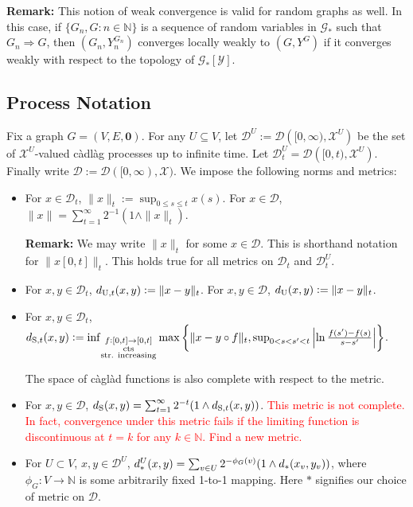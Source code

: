 \documentclass[12pt]{article}
\newcommand{\skipLine}{\vspace{12pt}}
\newcommand{\mb}{\mathbb}
\newcommand{\mc}{\mathcal}
\newcommand{\ra}{\rightarrow}
\newcommand{\te}{\text}
\newcommand{\tr}{\textcolor{red}}
\newcommand{\remark}{\textbf{Remark: }}
\newcommand{\defeq}{:=}								%
\newcommand{\cad}{\mc{D}}							%
\newcommand{\sta}{\mc{X}}							%
\renewcommand{\root}{\mathbf{0}}					%
\newcommand{\utmet}[1]{
\ifstrempty{#1}{
	d_{\te{U}}}{
	d_{\te{U},#1}}}									%
\newcommand{\stmet}[1]{
\ifstrempty{#1}{
	d_{\te{S}}}{
	d_{\te{S},#1}}}									%
\newcommand{\xf}{x}									%
\newcommand{\xg}{y}									%
\newcommand{\met}[2]{
\ifstrempty{#2}{
	d_{#1}}{
	d_{#1,#2}}}										%
\newcommand{\vind}[1]{_{#1}}						%
\newcommand{\tme}[1]{(#1)}							%
\newcommand{\tmi}[1]{#1}							%
\newcommand{\gind}[1]{^{#1}}						%
\newcommand{\vpara}[1]{^{#1}}						%
\newcommand{\tpara}[1]{_{#1}}						%
\newcommand{\Gs}{\mc{G}_\ast}						%
\newcommand{\spce}{\mc{Y}}							%
\renewcommand{\sp}[1]{[#1]}							%
\newcommand{\Xg}{Y}									%
\renewcommand{\it}[1]{_{#1}}						%
\begin{document}
\skipLine

\remark This notion of weak convergence is valid for random graphs as well. In this case, if \(\{G\it{n},G:n\in\mb{N}\}\) is a sequence of random variables in \(\Gs\) such that \(G\it{n}\Rightarrow G\), then \((G\it{n},\Xg\gind{G\it{n}}\it{n})\) converges locally weakly to \((G,\Xg\gind{G})\) if it converges weakly with respect to the topology of \(\Gs\sp{\spce}\).

\subsection{Process Notation}
\label{not::p}

Fix a graph \(G = (V,E,\root)\). For any \(U \subseteq V\), let \(\cad\vpara{U} := \cad\left([0,\infty),\sta^U\right)\) be the set of \(\sta^U\)-valued c\`adl\`ag processes up to infinite time. Let \(\cad\vpara{U}\tpara{t} = \cad\left([0,t),\sta^U\right)\). Finally write \(\cad \defeq \cad([0,\infty),\sta)\). We impose the following norms and metrics:

\begin{itemize}
\item For \(\xf \in \cad\tpara{t}\), \(\|\xf\|\tpara{t} \defeq \sup_{0\leq s \leq t} \xf\tme{s}\). For \(\xf \in \cad\), \(\|\xf\| = \sum_{t=1}^\infty 2^{-1}(1\wedge \|\xf\|\tpara{t})\).

\skipLine

\remark We may write \(\|\xf\|_t\) for some \(\xf \in \cad\). This is shorthand notation for \(\|\xf\tmi{[0,t]}\|_t\). This holds true for all metrics on \(\cad\tpara{t}\) and \(\cad\vpara{U}\tpara{t}\).

\skipLine 

\item For \(\xf,\xg \in \cad\tpara{t}\), \(\utmet{t}(\xf,\xg) \defeq \|\xf-\xg\|\tpara{t}\). For \(\xf,\xg \in \cad\), \(\utmet{}(\xf,\xg) \defeq \|\xf - \xg\|\tpara{t}\).

\item For \(\xf,\xg \in \cad\tpara{t}\), \(\stmet{t}(\xf,\xg)  \defeq \inf_{\substack{f:[0,t]\ra[0,t]\\\te{cts}\\\te{str. increasing}}}\max\left\{\|\xf-\xg\circ f\|\tpara{t},\sup_{0<s<s'<t}\left|\ln \frac{f(s') -f(s)}{s-s'}\right|\right\}\).

The space of c\`agl\`ad functions is also complete with respect to the metric.

\item For \(\xf,\xg \in \cad\), \(\stmet{}(\xf,\xg) = \sum_{t=1}^\infty 2^{-t}(1\wedge \stmet{t}(\xf,\xg))\). \tr{This metric is not complete. In fact, convergence under this metric fails if the limiting function is discontinuous at \(t = k\) for any \(k \in \mb{N}\). Find a new metric.}

\item For \(U \subset V\), \(\xf,\xg\in \cad\vpara{U}\), \(\met{\ast}{}\vpara{U}(\xf,\xg) = \sum_{v \in U} 2^{-\phi_G(v)}(1\wedge \met{\ast}{}(\xf\vind{v},\xg\vind{v}))\), where \(\phi_G: V \ra \mb{N}\) is some arbitrarily fixed 1-to-1 mapping. Here \(\ast\) signifies our choice of metric on \(\cad\).
\end{itemize}
\end{document}
